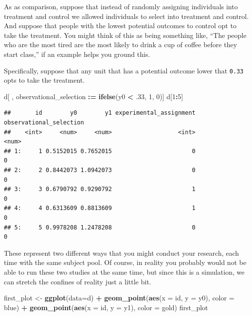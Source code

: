 \documentclass[
]{article}
\newenvironment{Shaded}{\begin{snugshade}}{\end{snugshade}}
\newcommand{\AttributeTok}[1]{\textcolor[rgb]{0.13,0.29,0.53}{#1}}
\newcommand{\DecValTok}[1]{\textcolor[rgb]{0.00,0.00,0.81}{#1}}
\newcommand{\FunctionTok}[1]{\textcolor[rgb]{0.13,0.29,0.53}{\textbf{#1}}}
\newcommand{\NormalTok}[1]{#1}
\newcommand{\OtherTok}[1]{\textcolor[rgb]{0.56,0.35,0.01}{#1}}
\newcommand{\SpecialCharTok}[1]{\textcolor[rgb]{0.81,0.36,0.00}{\textbf{#1}}}
\theoremstyle{definition}
\theoremstyle{definition}
\theoremstyle{definition}
\theoremstyle{definition}
\theoremstyle{remark}
\begin{document}
As as comparison, suppose that instead of randomly assigning individuals into treatment and control we allowed individuals to select into treatment and control. And suppose that people with the lowest potential outcomes to control opt to take the treatment. You might think of this as being something like, ``The people who are the most tired are the most likely to drink a cup of coffee before they start class,'' if an example helps you ground this.

Specifically, suppose that any unit that has a potential outcome lower that \texttt{0.33} opts to take the treatment.

\begin{Shaded}
\begin{Highlighting}[]
\NormalTok{d[ , observational\_selection }\SpecialCharTok{:=} \FunctionTok{ifelse}\NormalTok{(y0 }\SpecialCharTok{\textless{}}\NormalTok{ .}\DecValTok{33}\NormalTok{, }\DecValTok{1}\NormalTok{, }\DecValTok{0}\NormalTok{)]}
\NormalTok{d[}\DecValTok{1}\SpecialCharTok{:}\DecValTok{5}\NormalTok{]}
\end{Highlighting}
\end{Shaded}

\begin{verbatim}
##       id        y0        y1 experimental_assignment observational_selection
##    <int>     <num>     <num>                   <int>                   <num>
## 1:     1 0.5152015 0.7652015                       0                       0
## 2:     2 0.8442073 1.0942073                       0                       0
## 3:     3 0.6790792 0.9290792                       1                       0
## 4:     4 0.6313609 0.8813609                       1                       0
## 5:     5 0.9978208 1.2478208                       0                       0
\end{verbatim}

These represent two different ways that you might conduct your research, each time with the same subject pool. Of course, in reality you probably would not be able to run these two studies at the same time, but since this is a simulation, we can stretch the confines of reality just a little bit.

\begin{Shaded}
\begin{Highlighting}[]
\NormalTok{first\_plot }\OtherTok{\textless{}{-}} \FunctionTok{ggplot}\NormalTok{(}\AttributeTok{data=}\NormalTok{d) }\SpecialCharTok{+} 
  \FunctionTok{geom\_point}\NormalTok{(}\FunctionTok{aes}\NormalTok{(}\AttributeTok{x =}\NormalTok{ id, }\AttributeTok{y =}\NormalTok{ y0), }\AttributeTok{color =}\NormalTok{ blue) }\SpecialCharTok{+} 
  \FunctionTok{geom\_point}\NormalTok{(}\FunctionTok{aes}\NormalTok{(}\AttributeTok{x =}\NormalTok{ id, }\AttributeTok{y =}\NormalTok{ y1), }\AttributeTok{color =}\NormalTok{ gold)}
\NormalTok{first\_plot  }
\end{Highlighting}
\end{Shaded}
\end{document}
